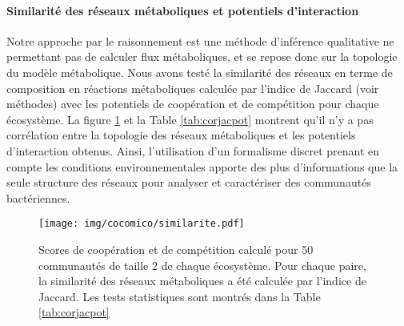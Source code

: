 \documentclass[../main.tex]{subfiles}
\begin{document}
\paragraph*{Similarité des réseaux métaboliques et potentiels d'interaction}
Notre approche par le raisonnement est une méthode d'inférence qualitative ne permettant pas de calculer flux métaboliques, et se repose donc sur la topologie du modèle métabolique. Nous avons testé la similarité des réseaux en terme de composition en réactions métaboliques calculée par l'indice de Jaccard (voir méthodes) avec les potentiels de coopération et de compétition pour chaque écosystème. La figure \ref{fig:similarite} et la Table \ref{tab:corjacpot} montrent qu'il n'y a pas corrélation entre la topologie des réseaux métaboliques et les potentiels d'interaction obtenus. Ainsi, l'utilisation d'un formalisme discret prenant en compte les conditions environnementales apporte des plus d'informations que la seule structure des réseaux pour analyser et caractériser des communautés bactériennes.

\begin{figure}[H]
    \centering
    \texttt{[image: img/cocomico/similarite.pdf]}
    \caption{Scores de coopération et de compétition calculé pour 50 communautés de taille 2 de chaque écosystème. Pour chaque paire, la similarité des réseaux métaboliques a été calculée par l'indice de Jaccard.  Les tests statistiques sont montrés dans la Table \ref{tab:corjacpot}}
    \label{fig:similarite}
\end{figure}

\begin{table*}[h!]
\caption{Résultat des tests de corrélation (Spearman) entre l'indice de similarité de Jaccard et les scores de potentiels d'interaction}
\label{tab:corjacpot}
\end{table*}
\end{document}
